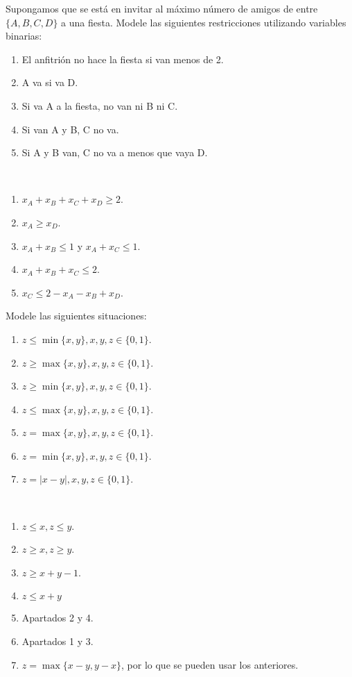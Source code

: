 \documentclass[twoside]{article}
\begin{document}
\begin{ejercicio}{2}
Supongamos que se está en invitar al máximo número de amigos de entre $\{A,B,C,D\}$ a una fiesta. Modele las siguientes restricciones utilizando variables binarias:
\begin{enumerate}
\item El anfitrión no hace la fiesta si van menos de 2.
\item A va si va D.
\item Si va A a la fiesta, no van ni B ni C.
\item Si van A y B, C no va.
\item Si A y B van, C no va a menos que vaya D.
\end{enumerate}
\end{ejercicio}
\begin{solucion}\
\begin{enumerate}
\item $x_A+x_B+x_C+x_D\geq 2$. 
\item $x_A\geq x_D$.
\item $x_A+ x_B\leq 1$ y $x_A+ x_C\leq 1$.  
\item $x_A+x_B+x_C\leq 2$. 
\item $x_C\leq 2-x_A-x_B+x_D$.  
\end{enumerate}
\end{solucion}

\newpage

\begin{ejercicio}{3}
Modele las siguientes situaciones:
\begin{enumerate}
\item $z\leq\min\{x,y\}, x,y,z\in\{0,1\}$.
\item $z\geq\max\{x,y\}, x,y,z\in\{0,1\}$.
\item $z\geq\min\{x,y\}, x,y,z\in\{0,1\}$.
\item $z\leq\max\{x,y\},x,y,z\in\{0,1\}$.
\item $z=\max\{x,y\}, x,y,z\in\{0,1\}$.
\item $z=\min\{x,y\}, x,y,z\in\{0,1\}$.
\item $z=|x-y|, x,y,z\in\{0,1\}$.
\end{enumerate}
\end{ejercicio}
\begin{solucion}\
\begin{enumerate}
\item $z\leq x,z\leq y$. 
\item $z\geq x,z\geq y$.
\item $z\geq x+y-1$.
\item $z\leq x+y$
\item Apartados 2 y 4.
\item Apartados 1 y 3.
\item $z=\max\{x-y,y-x\}$, por lo que se pueden usar los anteriores.
\end{enumerate}
\end{solucion}
\end{document}
